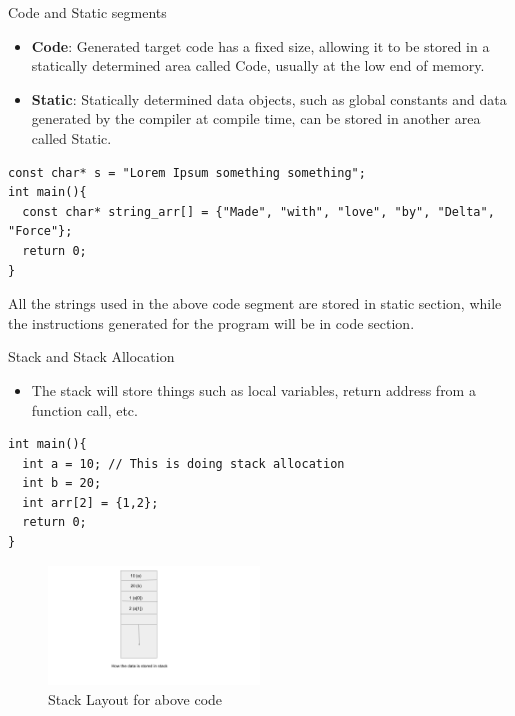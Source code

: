 \documentclass[
  10pt,
  ignorenonframetext,
]{beamer}
\providecommand{\tightlist}{%
  \setlength{\itemsep}{0pt}\setlength{\parskip}{0pt}}
\begin{document}
\begin{frame}[fragile]{Code and Static segments}
\protect\hypertarget{code-and-static-segments}{}
\begin{itemize}
\tightlist
\item
  \textbf{Code}: Generated target code has a fixed
  size, allowing it to be stored in a statically
  determined area called Code, usually at the low
  end of memory.
\end{itemize}

\pause

\begin{itemize}
\tightlist
\item
  \textbf{Static}: Statically determined data
  objects, such as global constants and data
  generated by the compiler at compile time, can
  be stored in another area called Static.
\end{itemize}

\pause

\scriptsize

\begin{verbatim}
const char* s = "Lorem Ipsum something something";
int main(){
  const char* string_arr[] = {"Made", "with", "love", "by", "Delta", "Force"};
  return 0;
}
\end{verbatim}

\normalsize

All the strings used in the above code segment are
stored in static section, while the instructions
generated for the program will be in code section.
\end{frame}

\begin{frame}[fragile]{Stack and Stack Allocation}
\protect\hypertarget{stack-and-stack-allocation}{}
\begin{itemize}
\tightlist
\item
  The stack will store things such as local
  variables, return address from a function call,
  etc.
\end{itemize}

\scriptsize

\begin{verbatim}
int main(){
  int a = 10; // This is doing stack allocation
  int b = 20;
  int arr[2] = {1,2};
  return 0;
}
\end{verbatim}

\normalsize

\begin{figure}
\centering
\includegraphics[width=0.5\textwidth,height=\textheight]{images/stack_layout.png}
\caption{Stack Layout for above code}
\end{figure}
\end{frame}
\end{document}
